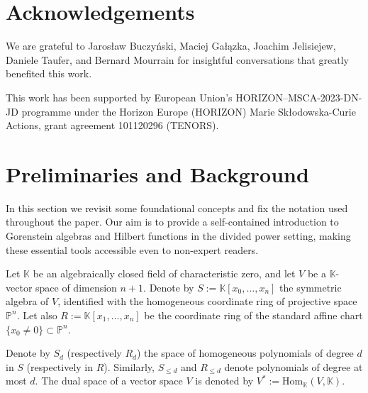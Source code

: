 \documentclass[a4paper,11p]{amsart}
\begin{document}
\section*{Acknowledgements}
We are grateful to Jarosław Buczyński, Maciej Gałązka, Joachim Jelisiejew, Daniele Taufer, and Bernard Mourrain for insightful conversations that greatly benefited this work.

\medskip

This work has been supported by European Union’s HORIZON–MSCA-2023-DN-JD programme under the Horizon Europe (HORIZON) Marie Skłodowska-Curie Actions, grant agreement 101120296 (TENORS).

\section{Preliminaries and Background}\label{sec:prelim}
In this section we revisit some foundational concepts and fix the notation used throughout the paper. Our aim is to provide a self-contained introduction to Gorenstein algebras and Hilbert functions in the divided power setting, making these essential tools accessible even to non-expert readers. 




\medskip

    Let $\mathbb{K}$ be an algebraically closed field of characteristic zero, and let $V$ be a $\mathbb{K}$-vector space of dimension $n+1$. Denote by $S := %
    \mathbb{K}[x_0, \ldots, x_n]$ the symmetric algebra of $V$, identified with the homogeneous coordinate ring of projective space $\mathbb{P}^n$. Let also $R := \mathbb{K}[x_1, \ldots, x_n]$ be the coordinate ring of the standard affine chart $\{x_0 \neq 0\} \subset \mathbb{P}^n$.

\medskip

Denote by $S_d$ (respectively $R_d$) the space of homogeneous polynomials of degree $d$ in $S$ (respectively in $R$). Similarly, $S_{\leq d}$ and $R_{\leq d}$ denote polynomials of degree at most $d$. The dual space of a vector space $V$ is denoted by $V^*:=\mathrm{Hom}_\mathbb{K}(V, \mathbb{K})$.
\end{document}
